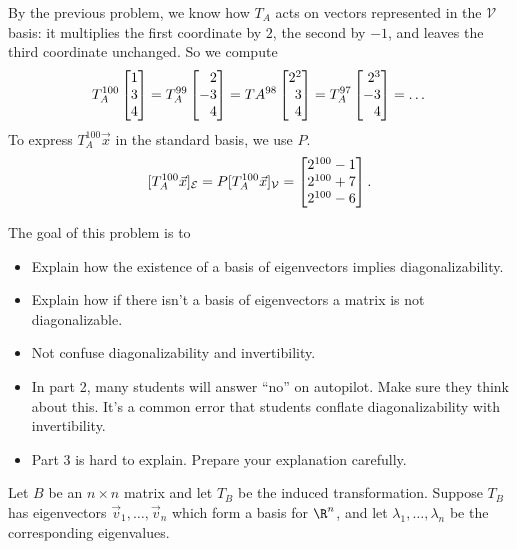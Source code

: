 \begin{parts}
\begin{solution}
				By the previous problem, we know how $T_A$ acts on vectors represented
				in the $\mathcal V$ basis: it multiplies the first coordinate by
				$2$, the second by $-1$, and leaves the third coordinate unchanged.
				So we compute
				\[
					T_A^{100}\mat{1\\3\\4}
					=T_A^{99}\mat{2\\-3\\4}
					=TA^{98}\mat{2^2\\3\\4}
					=T_A^{97}\mat{2^3\\-3\\4}
					=\dots
				\]
				To express $T_A^{100}\vec x$ in the standard basis, we use $P$.
				\[
					[T_A^{100}\vec x]_{\mathcal E} = P[T_A^{100}\vec x]_{\mathcal V} = \mat{2^{100}-1\\2^{100}+7\\2^{100}-6}.
				\]
			\end{solution}
	\end{parts}


	\bookonlynewpage
	\question
	\begin{annotation}
		\begin{goals}

			The goal of this problem is to
			\begin{itemize}
				\item Explain how the existence of a basis of eigenvectors implies diagonalizability.
				\item Explain how if there isn't a basis of eigenvectors a matrix is not diagonalizable.
				\item Not confuse diagonalizability and invertibility.
			\end{itemize}
		\end{goals}

		\begin{notes}
			\begin{itemize}
				\item In part 2, many students will answer ``no'' on autopilot. Make
					sure they think about this. It's a common error that students
					conflate diagonalizability with invertibility.
				\item Part 3 is hard to explain. Prepare your explanation carefully.
			\end{itemize}
		\end{notes}
	\end{annotation}
	Let $B$ be an $n\times n$ matrix and let $T_B$ be the induced transformation.
	Suppose $T_B$ has eigenvectors $\vec v_1,\ldots, \vec v_n$ which
	form a basis for $\R^n$, and let $\lambda_1,\ldots,\lambda_n$ be the corresponding
	eigenvalues.



